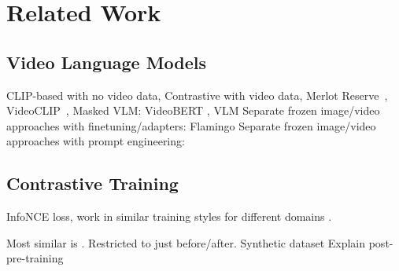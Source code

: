 \chapter{Related Work}
\label{chap:rel}

\section{Video Language Models}
\label{sec:vidlmb}

CLIP-based \citep{radford2021clip} with no video data, 
Contrastive with video data, Merlot Reserve~\cite{zellers2022mreserve}, VideoCLIP~\cite{xu2021videoclip}, \cite{luo2022clip4clip}
Masked VLM: VideoBERT \citep{sun2019videobert}, VLM \citep{xu2021vlm}
Separate frozen image/video approaches with finetuning/adapters: Flamingo \citep{alayrac2022flamingo}
Separate frozen image/video approaches with prompt engineering: \citep{wang2022vidil, zeng2023socratic}


\section{Contrastive Training}
\label{sec:contrastive}

InfoNCE loss, work in similar training styles for different domains
\citep{momeni2023verbs, yuksekgonul2023when}.

Most similar is \cite{bagad2023testoftime}. Restricted to just before/after.
Synthetic dataset
Explain post-pre-training
